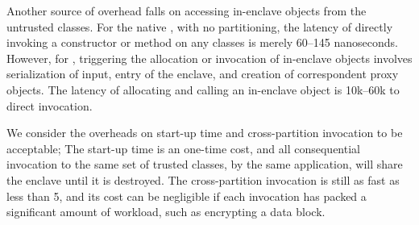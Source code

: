 Another source of overhead falls on accessing in-enclave objects
from the untrusted classes.
For the native \jvm{}, with no partitioning, the latency of directly invoking a constructor or method
on any classes is merely 60--145 nanoseconds.
However, for \sysname{}, triggering the allocation or invocation of in-enclave objects involves serialization of input, entry of the enclave,
and creation of correspondent proxy objects. The latency of allocating and calling an in-enclave object is 10k--60k \x{} to direct invocation.



We consider the overheads on start-up time and cross-partition invocation 
to be acceptable;
The start-up time is an one-time cost, and all consequential invocation to the same set of trusted classes, by the same application, will share the enclave until it is destroyed. 
The cross-partition invocation is still as fast as less than 5\usec{},
and its cost can be negligible if each invocation has packed a significant amount of workload, such as encrypting a data block.  

%				


